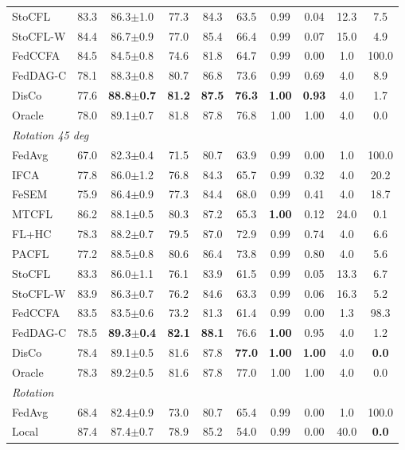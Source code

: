\begin{tabular}{lccccccccc}
StoCFL & 83.3 & 86.3$\pm$1.0 & 77.3 & 84.3 & 63.5 & 0.99 & 0.04 & 12.3 & 7.5 \\
StoCFL-W & 84.4 & 86.7$\pm$0.9 & 77.0 & 85.4 & 66.4 & 0.99 & 0.07 & 15.0 & 4.9 \\
FedCCFA & 84.5 & 84.5$\pm$0.8 & 74.6 & 81.8 & 64.7 & 0.99 & 0.00 & 1.0 & 100.0 \\
FedDAG-C & 78.1 & 88.3$\pm$0.8 & 80.7 & 86.8 & 73.6 & 0.99 & 0.69 & 4.0 & 8.9 \\
DisCo & 77.6 & \textbf{88.8$\pm$0.7} & \textbf{81.2} & \textbf{87.5} & \textbf{76.3} & \textbf{1.00} & \textbf{0.93} & 4.0 & 1.7 \\
Oracle & 78.0 & 89.1$\pm$0.7 & 81.8 & 87.8 & 76.8 & 1.00 & 1.00 & 4.0 & 0.0 \\
\midrule
\multicolumn{10}{l}{\textit{Rotation 45 deg}}\\
FedAvg & 67.0 & 82.3$\pm$0.4 & 71.5 & 80.7 & 63.9 & 0.99 & 0.00 & 1.0 & 100.0 \\
IFCA & 77.8 & 86.0$\pm$1.2 & 76.8 & 84.3 & 65.7 & 0.99 & 0.32 & 4.0 & 20.2 \\
FeSEM & 75.9 & 86.4$\pm$0.9 & 77.3 & 84.4 & 68.0 & 0.99 & 0.41 & 4.0 & 18.7 \\
MTCFL & 86.2 & 88.1$\pm$0.5 & 80.3 & 87.2 & 65.3 & \textbf{1.00} & 0.12 & 24.0 & 0.1 \\
FL+HC & 78.3 & 88.2$\pm$0.7 & 79.5 & 87.0 & 72.9 & 0.99 & 0.74 & 4.0 & 6.6 \\
PACFL & 77.2 & 88.5$\pm$0.8 & 80.6 & 86.4 & 73.8 & 0.99 & 0.80 & 4.0 & 5.6 \\
StoCFL & 83.3 & 86.0$\pm$1.1 & 76.1 & 83.9 & 61.5 & 0.99 & 0.05 & 13.3 & 6.7 \\
StoCFL-W & 83.9 & 86.3$\pm$0.7 & 76.2 & 84.6 & 63.3 & 0.99 & 0.06 & 16.3 & 5.2 \\
FedCCFA & 83.5 & 83.5$\pm$0.6 & 73.2 & 81.3 & 61.4 & 0.99 & 0.00 & 1.3 & 98.3 \\
FedDAG-C & 78.5 & \textbf{89.3$\pm$0.4} & \textbf{82.1} & \textbf{88.1} & 76.6 & \textbf{1.00} & 0.95 & 4.0 & 1.2 \\
DisCo & 78.4 & 89.1$\pm$0.5 & 81.6 & 87.8 & \textbf{77.0} & \textbf{1.00} & \textbf{1.00} & 4.0 & \textbf{0.0} \\
Oracle & 78.3 & 89.2$\pm$0.5 & 81.6 & 87.8 & 77.0 & 1.00 & 1.00 & 4.0 & 0.0 \\
\midrule
\multicolumn{10}{l}{\textit{Rotation}}\\
FedAvg & 68.4 & 82.4$\pm$0.9 & 73.0 & 80.7 & 65.4 & 0.99 & 0.00 & 1.0 & 100.0 \\
Local & 87.4 & 87.4$\pm$0.7 & 78.9 & 85.2 & 54.0 & 0.99 & 0.00 & 40.0 & \textbf{0.0} \\

\end{tabular}
